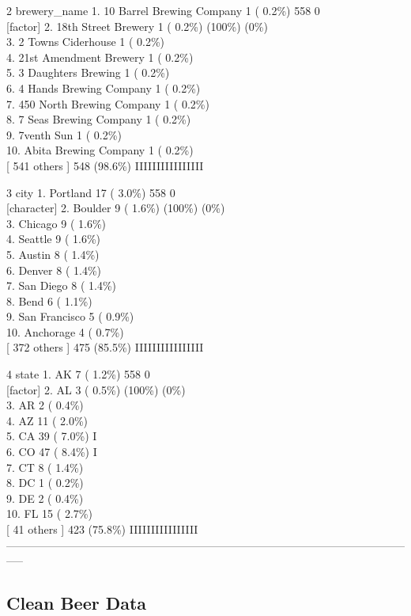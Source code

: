 \documentclass[]{article}
\begin{document}
2 brewery\_name 1. 10 Barrel Brewing Company 1 ( 0.2\%) 558 0\\
{[}factor{]} 2. 18th Street Brewery 1 ( 0.2\%) (100\%) (0\%)\\
3. 2 Towns Ciderhouse 1 ( 0.2\%)\\
4. 21st Amendment Brewery 1 ( 0.2\%)\\
5. 3 Daughters Brewing 1 ( 0.2\%)\\
6. 4 Hands Brewing Company 1 ( 0.2\%)\\
7. 450 North Brewing Company 1 ( 0.2\%)\\
8. 7 Seas Brewing Company 1 ( 0.2\%)\\
9. 7venth Sun 1 ( 0.2\%)\\
10. Abita Brewing Company 1 ( 0.2\%)\\
{[} 541 others {]} 548 (98.6\%) IIIIIIIIIIIIIIII

3 city 1. Portland 17 ( 3.0\%) 558 0\\
{[}character{]} 2. Boulder 9 ( 1.6\%) (100\%) (0\%)\\
3. Chicago 9 ( 1.6\%)\\
4. Seattle 9 ( 1.6\%)\\
5. Austin 8 ( 1.4\%)\\
6. Denver 8 ( 1.4\%)\\
7. San Diego 8 ( 1.4\%)\\
8. Bend 6 ( 1.1\%)\\
9. San Francisco 5 ( 0.9\%)\\
10. Anchorage 4 ( 0.7\%)\\
{[} 372 others {]} 475 (85.5\%) IIIIIIIIIIIIIIII

4 state 1. AK 7 ( 1.2\%) 558 0\\
{[}factor{]} 2. AL 3 ( 0.5\%) (100\%) (0\%)\\
3. AR 2 ( 0.4\%)\\
4. AZ 11 ( 2.0\%)\\
5. CA 39 ( 7.0\%) I\\
6. CO 47 ( 8.4\%) I\\
7. CT 8 ( 1.4\%)\\
8. DC 1 ( 0.2\%)\\
9. DE 2 ( 0.4\%)\\
10. FL 15 ( 2.7\%)\\
{[} 41 others {]} 423 (75.8\%) IIIIIIIIIIIIIIII\\
-----------------------------------------------------------------------------------------------------------------

\subsection{Clean Beer Data}\label{clean-beer-data}
\end{document}

